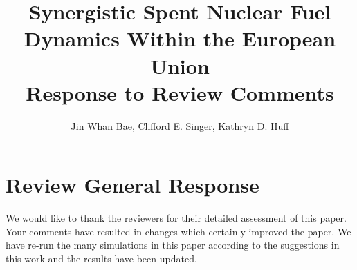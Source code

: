 \documentclass[answers,11pt]{exam}
\begin{document}


%

\title{Synergistic Spent Nuclear Fuel Dynamics Within the European Union\\
        \large Response to Review Comments}
\author{Jin Whan Bae, Clifford E. Singer, Kathryn D. Huff}



%
\maketitle
\section*{Review General Response}
We would like to thank the reviewers for their detailed assessment of
this paper. Your comments have resulted in changes which certainly improved the 
paper. We have re-run the many simulations in this paper according to the 
suggestions in this work and the results have been updated.
\end{document}
